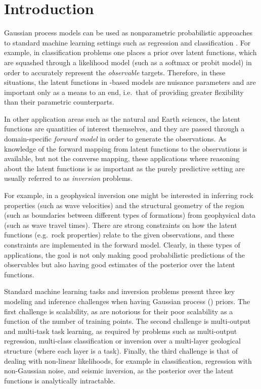 \section{Introduction}
% 

Gaussian process models can be used as nonparametric probabilistic approaches
to standard machine learning settings such as regression and classification
\cite{rasmussen-williams-book}. For example, in classification problems  one
places a  \gp prior over  latent functions, which are squashed through a
likelihood model (such as a softmax or probit model) in order to accurately
represent the \emph{observable} targets.  Therefore, in these situations, the
latent functions in \gp-based models are nuisance parameters and are important
only as a means to an end, i.e.~that of providing greater flexibility than
their parametric counterparts.
  
In other application areas such as the natural and Earth sciences, the latent
functions are quantities of interest themselves,  and they  are passed through
a domain-specific \emph{forward model} in order to generate the observations.
As knowledge of the forward mapping from latent functions to the observations
is available, but not the converse mapping, these applications where reasoning
about the latent functions is as important as the purely predictive setting
are usually referred to as \emph{inversion} problems. 

For example, in a geophysical inversion one might be interested in inferring
rock properties (such as wave velocities) and the structural geometry of the
region (such as boundaries between different types of formations) from
geophysical data (such as wave travel times). There are strong constraints on
how the latent functions (e.g.~rock properties) relate to the given
observations, and these constraints are implemented in the forward model.
Clearly, in these types of applications, the goal is not only making good
probabilistic predictions of the observables but also having good estimates of
the posterior over  the latent functions.

Standard machine learning tasks and inversion problems present three key
modeling and inference challenges when having Gaussian process (\gp) priors.
The first challenge is scalability, as  are notorious for their poor
scalability as a function of the number of training points. The second
challenge is multi-output and multi-task task learning, as required by problems
such as multi-output regression, multi-class classification or inversion over a
multi-layer geological structure (where each layer is a task).  Finally, the
third challenge is that of dealing with non-linear likelihoods, for example in
classification, regression with non-Gaussian noise, and seismic inversion, as
the posterior over the latent functions is analytically intractable.  

